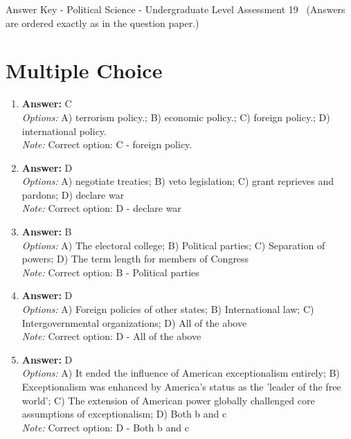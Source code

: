 \documentclass[12pt]{article}
\begin{document}
\begin{center}
Answer Key - Political Science - Undergraduate Level Assessment 19 \
\small (Answers are ordered exactly as in the question paper.)
\end{center}

\section*{Multiple Choice}
\begin{enumerate}[label=\arabic*.]
\item \textbf{Answer:} C
\\ \textit{Options:} A) terrorism policy.; B) economic policy.; C) foreign policy.; D) international policy.
\\ \textit{Note:} Correct option: C - foreign policy.
\item \textbf{Answer:} D
\\ \textit{Options:} A) negotiate treaties; B) veto legislation; C) grant reprieves and pardons; D) declare war
\\ \textit{Note:} Correct option: D - declare war
\item \textbf{Answer:} B
\\ \textit{Options:} A) The electoral college; B) Political parties; C) Separation of powers; D) The term length for members of Congress
\\ \textit{Note:} Correct option: B - Political parties
\item \textbf{Answer:} D
\\ \textit{Options:} A) Foreign policies of other states; B) International law; C) Intergovernmental organizations; D) All of the above
\\ \textit{Note:} Correct option: D - All of the above
\item \textbf{Answer:} D
\\ \textit{Options:} A) It ended the influence of American exceptionalism entirely; B) Exceptionalism was enhanced by America's status as the 'leader of the free world'; C) The extension of American power globally challenged core assumptions of exceptionalism; D) Both b and c
\\ \textit{Note:} Correct option: D - Both b and c
\end{enumerate}
\end{document}
